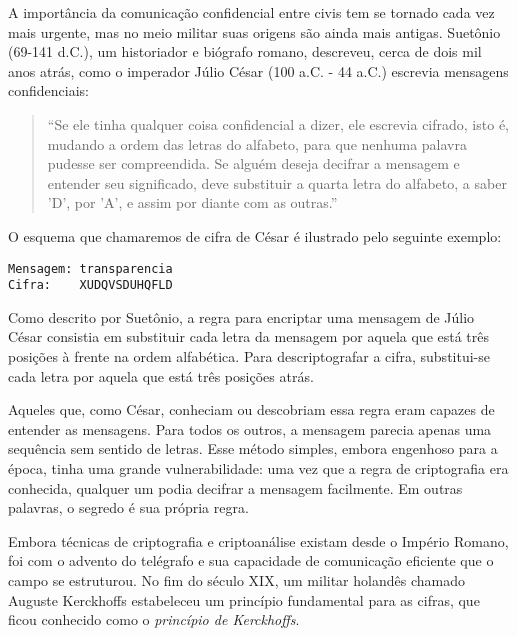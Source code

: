 \begin{center}
\end{center}

A importância da comunicação confidencial entre civis tem se tornado cada vez mais urgente, mas no meio militar suas origens são ainda mais antigas.
Suetônio (69-141 d.C.), um historiador e biógrafo romano, descreveu, cerca de dois mil anos atrás, como o imperador Júlio César (100 a.C. - 44 a.C.) escrevia mensagens confidenciais:

\begin{quote}
  ``Se ele tinha qualquer coisa confidencial a dizer, ele escrevia cifrado, isto é, mudando a ordem das letras do alfabeto, para que nenhuma palavra pudesse ser compreendida.
  Se alguém deseja decifrar a mensagem e entender seu significado, deve substituir a quarta letra do alfabeto, a saber 'D', por 'A', e assim por diante com as outras.''
\end{quote}

O esquema que chamaremos de cifra de César é ilustrado pelo seguinte exemplo:

\begin{verbatim}
Mensagem: transparencia
Cifra:    XUDQVSDUHQFLD
\end{verbatim}

Como descrito por Suetônio, a regra para encriptar uma mensagem de Júlio César consistia em substituir cada letra da mensagem por aquela que está três posições à frente na ordem alfabética.
Para descriptografar a cifra, substitui-se cada letra por aquela que está três posições atrás.

Aqueles que, como César, conheciam ou descobriam essa regra eram capazes de entender as mensagens.
Para todos os outros, a mensagem parecia apenas uma sequência sem sentido de letras.
Esse método simples, embora engenhoso para a época, tinha uma grande vulnerabilidade:
uma vez que a regra de criptografia era conhecida, qualquer um podia decifrar a mensagem facilmente.
Em outras palavras, o segredo é sua própria regra.

Embora técnicas de criptografia e criptoanálise existam desde o Império Romano, foi com o advento do telégrafo e sua capacidade de comunicação eficiente que o campo se estruturou.
No fim do século XIX, um militar holandês chamado Auguste Kerckhoffs estabeleceu um princípio fundamental para as cifras, que ficou conhecido como o {\em princípio de Kerckhoffs}.

